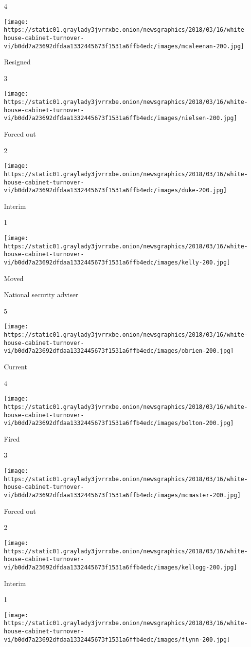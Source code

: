 4

\texttt{[image: https://static01.graylady3jvrrxbe.onion/newsgraphics/2018/03/16/white-house-cabinet-turnover-vi/b0dd7a23692dfdaa1332445673f1531a6ffb4edc/images/mcaleenan-200.jpg]}

Resigned

3

\texttt{[image: https://static01.graylady3jvrrxbe.onion/newsgraphics/2018/03/16/white-house-cabinet-turnover-vi/b0dd7a23692dfdaa1332445673f1531a6ffb4edc/images/nielsen-200.jpg]}

Forced out

2

\texttt{[image: https://static01.graylady3jvrrxbe.onion/newsgraphics/2018/03/16/white-house-cabinet-turnover-vi/b0dd7a23692dfdaa1332445673f1531a6ffb4edc/images/duke-200.jpg]}

Interim

1

\texttt{[image: https://static01.graylady3jvrrxbe.onion/newsgraphics/2018/03/16/white-house-cabinet-turnover-vi/b0dd7a23692dfdaa1332445673f1531a6ffb4edc/images/kelly-200.jpg]}

Moved

National security adviser

5

\texttt{[image: https://static01.graylady3jvrrxbe.onion/newsgraphics/2018/03/16/white-house-cabinet-turnover-vi/b0dd7a23692dfdaa1332445673f1531a6ffb4edc/images/obrien-200.jpg]}

Current

4

\texttt{[image: https://static01.graylady3jvrrxbe.onion/newsgraphics/2018/03/16/white-house-cabinet-turnover-vi/b0dd7a23692dfdaa1332445673f1531a6ffb4edc/images/bolton-200.jpg]}

Fired

3

\texttt{[image: https://static01.graylady3jvrrxbe.onion/newsgraphics/2018/03/16/white-house-cabinet-turnover-vi/b0dd7a23692dfdaa1332445673f1531a6ffb4edc/images/mcmaster-200.jpg]}

Forced out

2

\texttt{[image: https://static01.graylady3jvrrxbe.onion/newsgraphics/2018/03/16/white-house-cabinet-turnover-vi/b0dd7a23692dfdaa1332445673f1531a6ffb4edc/images/kellogg-200.jpg]}

Interim

1

\texttt{[image: https://static01.graylady3jvrrxbe.onion/newsgraphics/2018/03/16/white-house-cabinet-turnover-vi/b0dd7a23692dfdaa1332445673f1531a6ffb4edc/images/flynn-200.jpg]}

